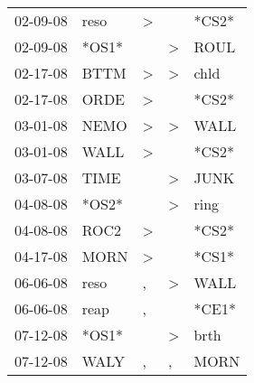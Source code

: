 \begin{supertabular}{p{0.07\textwidth}p{0.06\textwidth}p{0.02\textwidth}p{0.02\textwidth}p{0.06\textwidth}}
          02-09-08\textsuperscript{} &           reso\textsuperscript{} &     \textgreater &                  &                            *CS2* \\
          02-09-08\textsuperscript{} &                            *OS1* &                  &     \textgreater &           ROUL\textsuperscript{} \\
          02-17-08\textsuperscript{} &           BTTM\textsuperscript{} &     \textgreater &     \textgreater &           chld\textsuperscript{} \\
          02-17-08\textsuperscript{} &           ORDE\textsuperscript{} &     \textgreater &                  &                            *CS2* \\
          03-01-08\textsuperscript{} &           NEMO\textsuperscript{} &     \textgreater &     \textgreater &           WALL\textsuperscript{} \\
          03-01-08\textsuperscript{} &           WALL\textsuperscript{} &     \textgreater &                  &                            *CS2* \\
          03-07-08\textsuperscript{} &           TIME\textsuperscript{} &                  &     \textgreater &           JUNK\textsuperscript{} \\
          04-08-08\textsuperscript{} &                            *OS2* &                  &     \textgreater &           ring\textsuperscript{} \\
          04-08-08\textsuperscript{} &           ROC2\textsuperscript{} &     \textgreater &                  &                            *CS2* \\
          04-17-08\textsuperscript{} &           MORN\textsuperscript{} &     \textgreater &                  &                            *CS1* \\
          06-06-08\textsuperscript{} &           reso\textsuperscript{} &                , &     \textgreater &           WALL\textsuperscript{} \\
          06-06-08\textsuperscript{} &           reap\textsuperscript{} &                , &                  &                            *CE1* \\
          07-12-08\textsuperscript{} &                            *OS1* &                  &     \textgreater &           brth\textsuperscript{} \\
          07-12-08\textsuperscript{} &           WALY\textsuperscript{} &                , &                , &           MORN\textsuperscript{} \\

\end{supertabular}
